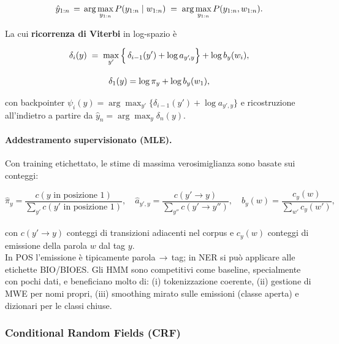                 \begin{gather}
                    \notag\hat y_{1:n} \,=\, \arg\max_{y_{1:n}} P(y_{1:n} \mid w_{1:n}) \;=\; \arg\max_{y_{1:n}} P(y_{1:n}, w_{1:n}).
                \end{gather}
                
                La cui \textbf{ricorrenza di Viterbi} in log-spazio è
                
                
                \begin{gather}
                    \notag\delta_i(y) \;=\; \max_{y'}\Big\{\, \delta_{i-1}(y') + \log a_{y'\!,y} \Big\} + \log b_y(w_i),\\[2ex]
                    \notag\delta_1(y)=\log \pi_y + \log b_y(w_1),
                \end{gather}
                
                con backpointer $\psi_i(y)=\arg\max_{y'}\{\delta_{i-1}(y') + \log a_{y'\!,y}\}$ e ricostruzione all’indietro a partire da $\hat y_n=\arg\max_y \delta_n(y)$.
                
                \paragraph{Addestramento supervisionato (MLE).}
                Con training etichettato, le stime di massima verosimiglianza sono basate sui conteggi:
                
                $$
                    \hat \pi_y = \frac{c(y\text{ in posizione 1})}{\sum_{y'} c(y' \text{ in posizione 1})},\quad
                    \hat a_{y'\!,y} = \frac{c(y'\!\to y)}{\sum_{y''} c(y'\!\to y'')},\quad
                    \hat b_y(w) = \frac{c_y(w)}{\sum_{w'} c_y(w')},
                $$\\                
                con $c(y'\!\to y)$ conteggi di transizioni adiacenti nel corpus e $c_y(w)$ conteggi di emissione della parola $w$ dal tag $y$.\\
                
                In POS l’emissione è tipicamente parola\,$\to$\,tag; in NER si può applicare alle etichette BIO/BIOES. Gli HMM sono competitivi come baseline, specialmente con pochi dati, e beneficiano molto di: (i) tokenizzazione coerente, (ii) gestione di MWE per nomi propri, (iii) smoothing mirato sulle emissioni (classe aperta) e dizionari per le classi chiuse.
    
            \subsubsection{Conditional Random Fields (CRF)}
            
